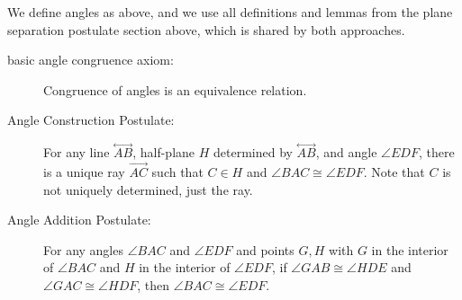 \documentclass[12pt]{article}
\newcommand\Line[1]{\overset{\leftrightarrow}{#1}}
\begin{document}
We define angles as above, and we use all definitions and lemmas from the plane separation postulate section above, which is shared by both approaches.

\begin{description}

\item[basic angle congruence axiom:]  Congruence of angles is an equivalence relation.

\item[Angle Construction Postulate:]  For any line $\Line{AB}$, half-plane $H$ determined by $\Line{AB}$,  and angle $\angle EDF$, there is a unique ray $\overrightarrow{AC}$ such that $C \in H$ and $\angle BAC \cong \angle EDF$.  Note that $C$ is not uniquely determined, just the ray.

\item[Angle Addition Postulate:]  For any angles $\angle BAC$ and $\angle EDF$ and points $G,H$ with $G$ in the interior of $\angle BAC$ and $H$ in the interior of $\angle EDF$, if $\angle GAB \cong \angle HDE$ and $\angle GAC \cong \angle HDF$, then $\angle BAC \cong \angle EDF$.


\end{description}
\end{document}
